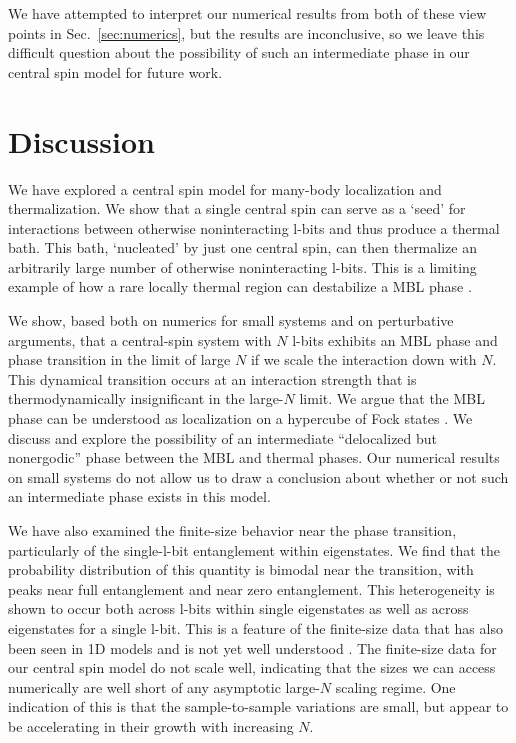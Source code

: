 \documentclass[aps,pra,twocolumn,a4paper,showpacs,superscriptaddress,floatfix,10pt]{revtex4}
\begin{document}
We have attempted to interpret our numerical results from both of these view points in Sec.~\ref{sec:numerics}, but the results are inconclusive, so we leave this difficult question about the possibility of such an intermediate phase in our central spin model for future work.


\section{Discussion}
\label{sec:discussion}

We have explored a central spin model for many-body localization and thermalization.  We show that a single central spin can serve as a `seed' for interactions between otherwise noninteracting l-bits and thus produce a thermal bath.  This bath, `nucleated' by just one central spin, can then thermalize an arbitrarily large number of otherwise noninteracting l-bits.  This is a limiting example of how a rare locally thermal region can destabilize a MBL phase \cite{De-Roeck:2017aa}.

We show, based both on numerics for small systems and on perturbative arguments, that a central-spin system with $N$ l-bits exhibits an MBL phase and phase transition in the limit of large $N$ if we scale the interaction down with $N$.  This dynamical transition occurs at an interaction strength that is thermodynamically insignificant in the large-$N$ limit.  We argue that the MBL phase can be understood as localization on a hypercube of Fock states \cite{Altshuler:1997aa}.  We discuss and explore the possibility of an intermediate ``delocalized but nonergodic'' phase between the MBL and thermal phases.  Our numerical results on small systems do not allow us to draw a conclusion about whether or not such an intermediate phase exists in this model.

We have also examined the finite-size behavior near the phase transition, particularly of the single-l-bit entanglement within eigenstates.  We find that the probability distribution of this quantity is bimodal near the transition, with peaks near full entanglement and near zero entanglement.  This heterogeneity is shown to occur both across l-bits within single eigenstates as well as across eigenstates for a single l-bit.  This is a feature of the finite-size data that has also been seen in 1D models and is not yet well understood \cite{Yu:2016aa,Khemani:2016aa}.  The finite-size data for our central spin model do not scale well, indicating that the sizes we can access numerically are well short of any asymptotic large-$N$ scaling regime.  One indication of this is that the sample-to-sample variations are small, but appear to be accelerating in their growth with increasing $N$.
\end{document}
